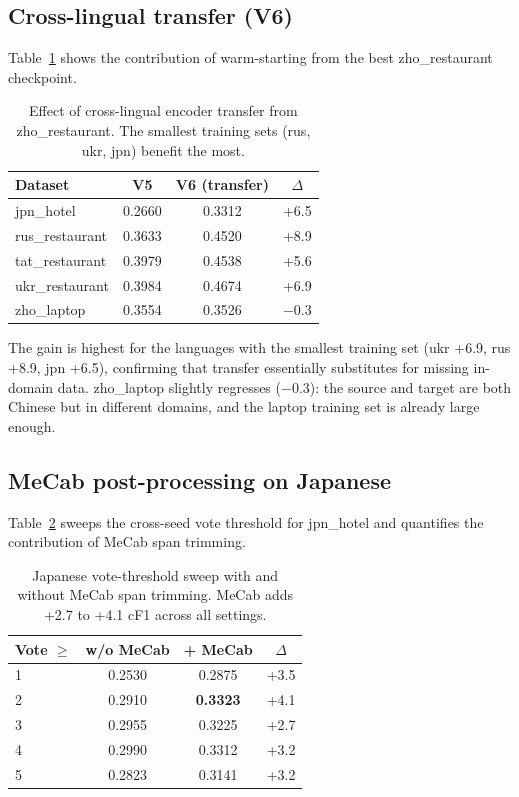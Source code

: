 \documentclass[runningheads]{llncs}
\begin{document}
\subsection{Cross-lingual transfer (V6)}

Table~\ref{tab:transfer} shows the contribution of warm-starting from
the best zho\_restaurant checkpoint.

\begin{table}[htbp]
\centering\small
\caption{Effect of cross-lingual encoder transfer from
zho\_restaurant. The smallest training sets (rus, ukr, jpn) benefit
the most.}
\label{tab:transfer}
\begin{tabular}{lccc}
\toprule
Dataset & V5 & V6 (transfer) & $\Delta$ \\
\midrule
jpn\_hotel      & 0.2660 & 0.3312 & +6.5 \\
rus\_restaurant & 0.3633 & 0.4520 & +8.9 \\
tat\_restaurant & 0.3979 & 0.4538 & +5.6 \\
ukr\_restaurant & 0.3984 & 0.4674 & +6.9 \\
zho\_laptop     & 0.3554 & 0.3526 & $-$0.3 \\
\bottomrule
\end{tabular}
\end{table}

The gain is highest for the languages with the smallest training set
(ukr +6.9, rus +8.9, jpn +6.5), confirming that transfer essentially
substitutes for missing in-domain data. zho\_laptop slightly regresses
($-$0.3): the source and target are both Chinese but in different
domains, and the laptop training set is already large enough.

\subsection{MeCab post-processing on Japanese}

Table~\ref{tab:jpnvote} sweeps the cross-seed vote threshold for
jpn\_hotel and quantifies the contribution of MeCab span trimming.

\begin{table}[htbp]
\centering\small
\caption{Japanese vote-threshold sweep with and without MeCab span
trimming. MeCab adds +2.7 to +4.1 cF1 across all settings.}
\label{tab:jpnvote}
\begin{tabular}{lccc}
\toprule
Vote $\geq$ & w/o MeCab & + MeCab & $\Delta$ \\
\midrule
1 & 0.2530 & 0.2875 & +3.5 \\
2 & 0.2910 & \textbf{0.3323} & +4.1 \\
3 & 0.2955 & 0.3225 & +2.7 \\
4 & 0.2990 & 0.3312 & +3.2 \\
5 & 0.2823 & 0.3141 & +3.2 \\
\bottomrule
\end{tabular}
\end{table}
\end{document}
